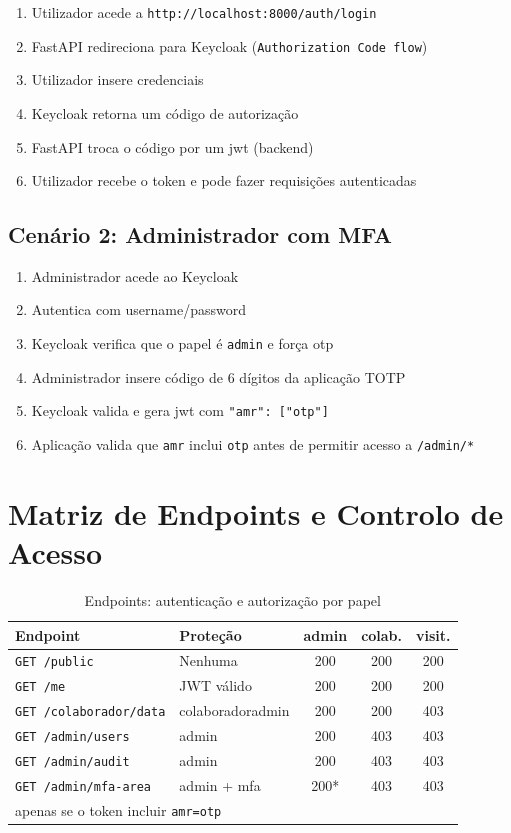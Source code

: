 \begin{enumerate}
  \item Utilizador acede a \texttt{http://localhost:8000/auth/login}
  \item FastAPI redireciona para Keycloak (\texttt{Authorization Code flow})
  \item Utilizador insere credenciais
  \item Keycloak retorna um código de autorização
  \item FastAPI troca o código por um \gls{jwt} (backend)
  \item Utilizador recebe o token e pode fazer requisições autenticadas
\end{enumerate}

\subsection{Cenário 2: Administrador com MFA}

\begin{enumerate}
  \item Administrador acede ao Keycloak
  \item Autentica com username/password
  \item Keycloak verifica que o papel é \texttt{admin} e força \gls{otp}
  \item Administrador insere código de 6 dígitos da aplicação TOTP
  \item Keycloak valida e gera \gls{jwt} com \texttt{"amr": ["otp"]}
  \item Aplicação valida que \texttt{amr} inclui \texttt{otp} antes de permitir acesso a \texttt{/admin/*}
\end{enumerate}

\section{Matriz de Endpoints e Controlo de Acesso}

\begin{table}[h!]
\centering
\caption{Endpoints: autenticação e autorização por papel}
\label{tab:endpoints}
\begin{tabular}{|l|l|c|c|c|}
\hline
\textbf{Endpoint} & \textbf{Proteção} & \textbf{admin} & \textbf{colab.} & \textbf{visit.} \\ \hline
\texttt{GET /public} & Nenhuma & 200 & 200 & 200 \\ \hline
\texttt{GET /me} & JWT válido & 200 & 200 & 200 \\ \hline
\texttt{GET /colaborador/data} & colaborador\textbar{}admin & 200 & 200 & 403 \\ \hline
\texttt{GET /admin/users} & admin & 200 & 403 & 403 \\ \hline
\texttt{GET /admin/audit} & admin & 200 & 403 & 403 \\ \hline
\texttt{GET /admin/mfa-area} & admin + \gls{mfa} & 200* & 403 & 403 \\ \hline
\multicolumn{5}{l}{\footnotesize * apenas se o token incluir \texttt{amr=otp}} \\
\end{tabular}
\end{table}

